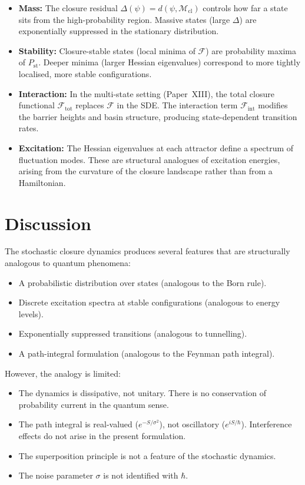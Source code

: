 \documentclass[12pt]{article}
\newcommand{\Mcl}{\mathcal{M}_{\mathrm{cl}}}
\newcommand{\Fcal}{\mathcal{F}}
\newcommand{\Ftot}{\Fcal_{\mathrm{tot}}}
\begin{document}
\begin{itemize}
    \item \textbf{Mass:} The closure residual $\Delta(\psi) = d(\psi, \Mcl)$ controls how far a state sits from the high-probability region. Massive states (large $\Delta$) are exponentially suppressed in the stationary distribution.
    \item \textbf{Stability:} Closure-stable states (local minima of $\Fcal$) are probability maxima of $P_{\mathrm{st}}$. Deeper minima (larger Hessian eigenvalues) correspond to more tightly localised, more stable configurations.
    \item \textbf{Interaction:} In the multi-state setting (Paper~XIII), the total closure functional $\Ftot$ replaces $\Fcal$ in the SDE. The interaction term $\Fcal_{\mathrm{int}}$ modifies the barrier heights and basin structure, producing state-dependent transition rates.
    \item \textbf{Excitation:} The Hessian eigenvalues at each attractor define a spectrum of fluctuation modes. These are structural analogues of excitation energies, arising from the curvature of the closure landscape rather than from a Hamiltonian.
\end{itemize}

\section{Discussion}\label{sec:discussion}

The stochastic closure dynamics produces several features that are structurally analogous to quantum phenomena:

\begin{itemize}
    \item A probabilistic distribution over states (analogous to the Born rule).
    \item Discrete excitation spectra at stable configurations (analogous to energy levels).
    \item Exponentially suppressed transitions (analogous to tunnelling).
    \item A path-integral formulation (analogous to the Feynman path integral).
\end{itemize}

However, the analogy is limited:

\begin{itemize}
    \item The dynamics is dissipative, not unitary. There is no conservation of probability current in the quantum sense.
    \item The path integral is real-valued ($e^{-S/\sigma^2}$), not oscillatory ($e^{iS/\hbar}$). Interference effects do not arise in the present formulation.
    \item The superposition principle is not a feature of the stochastic dynamics.
    \item The noise parameter $\sigma$ is not identified with $\hbar$.
\end{itemize}
\end{document}
